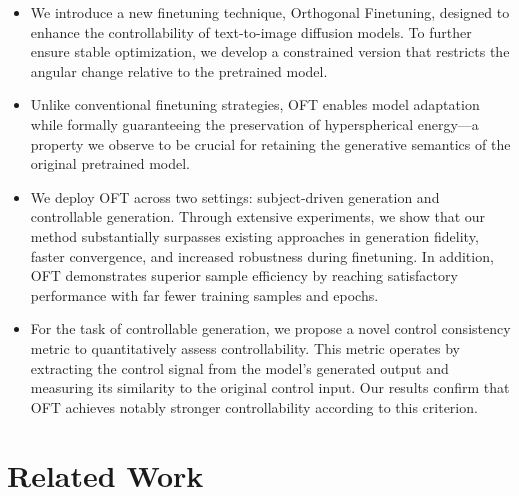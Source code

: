 \begin{itemize}[leftmargin=*,nosep]

    \item We introduce a new finetuning technique, Orthogonal Finetuning, designed to enhance the controllability of text-to-image diffusion models. To further ensure stable optimization, we develop a constrained version that restricts the angular change relative to the pretrained model.
    \item Unlike conventional finetuning strategies, OFT enables model adaptation while formally guaranteeing the preservation of hyperspherical energy—a property we observe to be crucial for retaining the generative semantics of the original pretrained model.
    \item We deploy OFT across two settings: subject-driven generation and controllable generation. Through extensive experiments, we show that our method substantially surpasses existing approaches in generation fidelity, faster convergence, and increased robustness during finetuning. In addition, OFT demonstrates superior sample efficiency by reaching satisfactory performance with far fewer training samples and epochs.
    \item For the task of controllable generation, we propose a novel control consistency metric to quantitatively assess controllability. This metric operates by extracting the control signal from the model’s generated output and measuring its similarity to the original control input. Our results confirm that OFT achieves notably stronger controllability according to this criterion.
\end{itemize}

\section{Related Work}

